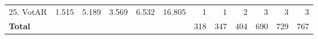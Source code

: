 \begin{table*}[t]
\begin{tabular}{l||r|r|r|r|r||r|r|r||r|r|r}
  25. VotAR                  & 1.515                 & 5.189                    & 3.569                      & 6.532                                      & 16.805                                  & 1                           & 1                            & 2                         & 3                           & 3                            & 3                          \\\hhline{=#*{4}{=}=#=|=|=#=|=|=}
    \textbf{Total}       & \multicolumn{1}{r}{}  & \multicolumn{1}{r}{}     & \multicolumn{1}{r}{}       & \multicolumn{1}{r}{}                       & \multicolumn{1}{r||}{}                    & 318                         & 347                          & 404                       & 690                         & 729                          & 767
  \end{tabular}
\end{table*}
